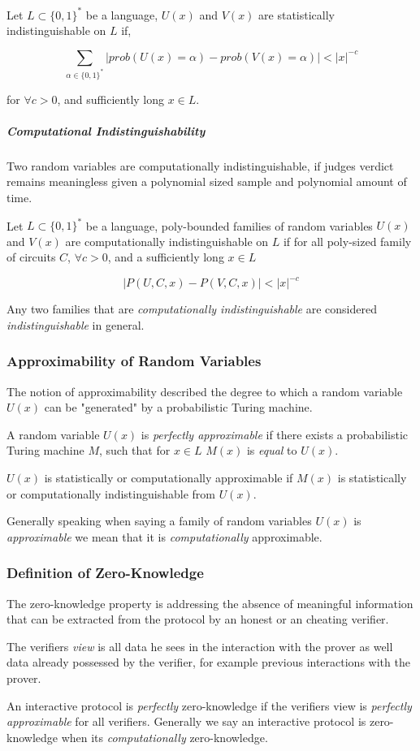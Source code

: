 Let $L \subset \{0,1\}^*$ be a language, $U(x)$ and $V(x)$ are statistically indistinguishable on $L$ if,

$$\sum_{\alpha \in \{0,1\}^*} |prob(U(x) = \alpha) - prob(V(x) = \alpha) | < |x|^{-c}$$

for $\forall c > 0$, and sufficiently long $x \in L$. 

\subparagraph{Computational Indistinguishability}

Two random variables are computationally indistinguishable, if judges verdict remains meaningless given a polynomial sized sample and polynomial amount of time.

\bigskip

Let $L \subset \{0,1\}^*$ be a language, poly-bounded families of random variables $U(x)$ and $V(x)$ are computationally indistinguishable on $L$ if for all poly-sized family of circuits $C$, $\forall c > 0$, and a sufficiently long $x \in L$

$$|P(U, C, x) - P(V, C, x)| < |x|^{-c}$$

Any two families that are \textit{computationally indistinguishable} are considered  \textit{indistinguishable} in general.

\subsubsection{Approximability of Random Variables}

The notion of approximability described the degree to which a random variable $U(x)$ can be "generated" by a probabilistic Turing machine.

\bigskip

A random variable $U(x)$ is \textit{perfectly approximable} if there exists a probabilistic Turing machine $M$, such that for $x \in L$ $M(x)$ is \textit{equal} to $U(x)$.

$U(x)$ is statistically or computationally approximable if $M(x)$ is statistically or computationally indistinguishable from $U(x)$.

\bigskip

Generally speaking when saying a family of random variables $U(x)$ is \textit{approximable} we mean that it is \textit{computationally} approximable.

\subsubsection{Definition of Zero-Knowledge}

The zero-knowledge property is addressing the absence of meaningful information that can be extracted from the protocol by an honest or an cheating verifier.


The verifiers \textit{view} is all data he sees in the interaction with the prover as well data already possessed by the verifier, for example previous interactions with the prover.

\bigskip

An interactive protocol is \textit{perfectly} zero-knowledge if the verifiers view is \textit{perfectly approximable} for all verifiers. Generally we say an interactive protocol is zero-knowledge when its \textit{computationally} zero-knowledge.

\newpage